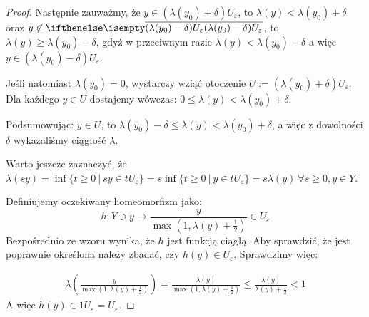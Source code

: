 \begin{lem}
\begin{proof}
    Następnie zauważmy, że $y \in (\lambda(y_0) + \delta) U_\varepsilon$, to $\lambda(y) < \lambda(y_0) + \delta$ oraz $y \not\in \cl{(\lambda(y_0) - \delta) U_\varepsilon}$, to $\lambda(y) \geq \lambda(y_0) - \delta$, gdyż w przeciwnym razie $\lambda(y) < \lambda(y_0) - \delta$ a więc $y \in (\lambda(y_0) - \delta) U_\varepsilon$.
    
    Jeśli natomiast $\lambda(y_0) = 0$, wystarczy wziąć otoczenie $U := (\lambda(y_0) + \delta)U_\varepsilon$. Dla każdego $y \in U$ dostajemy wówczas: $0 \leq \lambda(y) < \lambda(y_0) + \delta$.
    
    Podsumowując: $y \in U$, to $\lambda(y_0) - \delta \leq \lambda(y) < \lambda(y_0) + \delta$, a więc z dowolności $\delta$ wykazaliśmy ciągłość $\lambda$.
    
    Warto jeszcze zaznaczyć, że $\lambda(sy) = \inf \{t \geq 0\ |\ sy \in t U_\varepsilon\} = s\inf \{t \geq 0\ |\ y \in t U_\varepsilon\} = s \lambda(y)\ \forall s \geq 0, y \in Y$.
    
    Definiujemy oczekiwany homeomorfizm jako:
    \[
      h: Y \ni y \to \frac{y}{\max\left(1, \lambda(y) + \frac{1}{2}\right)} \in U_\varepsilon
    \]
    Bezpośrednio ze wzoru wynika, że $h$ jest funkcją ciągłą. Aby sprawdzić, że jest poprawnie określona należy zbadać, czy $h(y) \in U_\varepsilon$. Sprawdzimy więc:
    
    \begin{align*}
      \lambda\left(\frac{y}{\max\left(1, \lambda(y) + \frac{1}{2}\right)}\right) =
      \frac{\lambda(y)}{\max\left(1, \lambda(y) + \frac{1}{2}\right)} \leq
      \frac{\lambda(y)}{\lambda(y) + \frac{1}{2}} < 1
    \end{align*}
    A więc $h(y) \in 1 U_\varepsilon = U_\varepsilon$.
    

\end{proof}
\end{lem}
